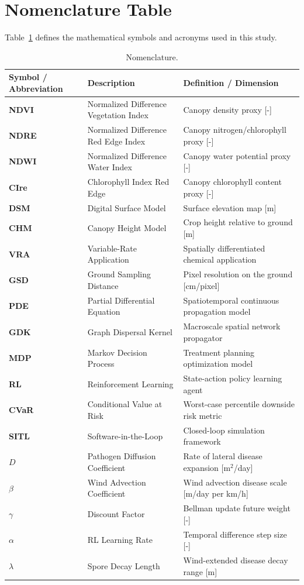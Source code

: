 \documentclass[review,3p,times,authoryear]{elsarticle}
\begin{document}
\appendix

\section{Nomenclature Table}
Table~\ref{tab:nomenclature} defines the mathematical symbols and acronyms used in this study.

\begin{table}[H]
\centering
\caption{Nomenclature.}
\label{tab:nomenclature}
\begin{tabular}{lll}
\toprule
Symbol / Abbreviation & Description & Definition / Dimension \\
\midrule
\textbf{NDVI} & Normalized Difference Vegetation Index & Canopy density proxy [-] \\
\textbf{NDRE} & Normalized Difference Red Edge Index & Canopy nitrogen/chlorophyll proxy [-] \\
\textbf{NDWI} & Normalized Difference Water Index & Canopy water potential proxy [-] \\
\textbf{CIre} & Chlorophyll Index Red Edge & Canopy chlorophyll content proxy [-] \\
\textbf{DSM} & Digital Surface Model & Surface elevation map [m] \\
\textbf{CHM} & Canopy Height Model & Crop height relative to ground [m] \\
\textbf{VRA} & Variable-Rate Application & Spatially differentiated chemical application \\
\textbf{GSD} & Ground Sampling Distance & Pixel resolution on the ground [cm/pixel] \\
\textbf{PDE} & Partial Differential Equation & Spatiotemporal continuous propagation model \\
\textbf{GDK} & Graph Dispersal Kernel & Macroscale spatial network propagator \\
\textbf{MDP} & Markov Decision Process & Treatment planning optimization model \\
\textbf{RL} & Reinforcement Learning & State-action policy learning agent \\
\textbf{CVaR} & Conditional Value at Risk & Worst-case percentile downside risk metric \\
\textbf{SITL} & Software-in-the-Loop & Closed-loop simulation framework \\
$D$ & Pathogen Diffusion Coefficient & Rate of lateral disease expansion [m$^2$/day] \\
$\beta$ & Wind Advection Coefficient & Wind advection disease scale [m/day per km/h] \\
$\gamma$ & Discount Factor & Bellman update future weight [-] \\
$\alpha$ & RL Learning Rate & Temporal difference step size [-] \\
$\lambda$ & Spore Decay Length & Wind-extended disease decay range [m] \\
\bottomrule
\end{tabular}
\end{table}
\end{document}
